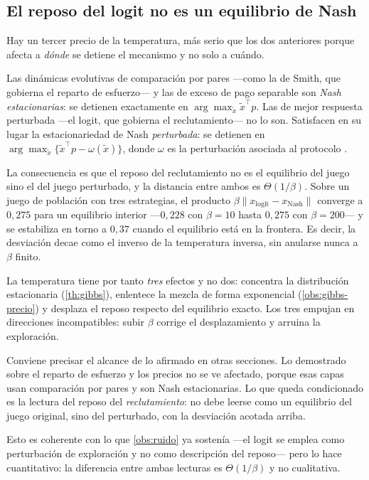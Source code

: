 \subsection{El reposo del logit no es un equilibrio de Nash}

Hay un tercer precio de la temperatura, más serio que los dos anteriores porque
afecta a \emph{dónde} se detiene el mecanismo y no solo a cuándo.

\begin{proposicion}
\label{pr:nash-perturbado}
Las dinámicas evolutivas de comparación por pares —como la de Smith, que gobierna
el reparto de esfuerzo— y las de exceso de pago separable son \emph{Nash
estacionarias}: se detienen exactamente en $\arg\max_{\tilde x}\tilde x^{\!\top}p$.
Las de mejor respuesta perturbada —el logit, que gobierna el reclutamiento— no lo
son. Satisfacen en su lugar la estacionariedad de Nash \emph{perturbada}: se
detienen en $\arg\max_{\tilde x}\{\tilde x^{\!\top}p-\omega(\tilde x)\}$, donde
$\omega$ es la perturbación asociada al protocolo \cite{martinezPiazuelo2025gne}.
\end{proposicion}

\begin{observacion}
\label{obs:desplazamiento-logit}
La consecuencia es que el reposo del reclutamiento no es el equilibrio del juego
sino el del juego perturbado, y la distancia entre ambos es $\Theta(1/\beta)$.
Sobre un juego de población con tres estrategias, el producto
$\beta\lVert x_{\mathrm{logit}}-x_{\mathrm{Nash}}\rVert$ converge a
$0{,}275$ para un equilibrio interior —$0{,}228$ con $\beta=10$ hasta $0{,}275$
con $\beta=200$— y se estabiliza en torno a $0{,}37$ cuando el equilibrio está en
la frontera. Es decir, la desviación decae como el inverso de la temperatura
inversa, sin anularse nunca a $\beta$ finito.

La temperatura tiene por tanto \emph{tres} efectos y no dos: concentra la
distribución estacionaria (\cref{th:gibbs}), enlentece la mezcla de forma
exponencial (\cref{obs:gibbs-precio}) y desplaza el reposo respecto del
equilibrio exacto. Los tres empujan en direcciones incompatibles: subir $\beta$
corrige el desplazamiento y arruina la exploración.
\end{observacion}

\begin{observacion}
\label{obs:nash-perturbado-alcance}
Conviene precisar el alcance de lo afirmado en otras secciones. Lo demostrado
sobre el reparto de esfuerzo y los precios no se ve afectado, porque esas capas
usan comparación por pares y son Nash estacionarias. Lo que queda condicionado es
la lectura del reposo del \emph{reclutamiento}: no debe leerse como un equilibrio
del juego original, sino del perturbado, con la desviación acotada arriba.

Esto es coherente con lo que \cref{obs:ruido} ya sostenía —el logit se emplea
como perturbación de exploración y no como descripción del reposo— pero lo hace
cuantitativo: la diferencia entre ambas lecturas es $\Theta(1/\beta)$ y no
cualitativa.
\end{observacion}

